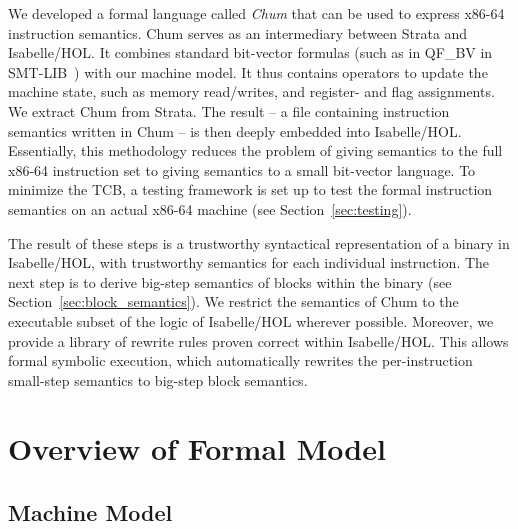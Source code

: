 We developed a formal language called \emph{Chum} that can be used to express x86-64 instruction semantics.
Chum serves as an intermediary between Strata and Isabelle/HOL.
It combines standard bit-vector formulas (such as in QF\_BV in SMT-LIB~\cite{barrett2010smt}) with our machine model.
It thus contains operators to update the machine state, such as memory read/writes, and register- and flag assignments.
We extract Chum from Strata.
The result -- a file containing instruction semantics written in Chum -- is then deeply embedded into Isabelle/HOL.
Essentially, this methodology reduces the problem of giving semantics to the full x86-64 instruction set to giving semantics to a small bit-vector language.
To minimize the TCB, a testing framework is set up to test the formal instruction semantics on an actual x86-64 machine (see Section~\ref{sec:testing}).

The result of these steps is a trustworthy syntactical representation of a binary in Isabelle/HOL, with trustworthy semantics for each individual instruction.
The next step is to derive big-step semantics of blocks within the binary (see Section~\ref{sec:block_semantics}).
We restrict the semantics of Chum to the executable subset of the logic of Isabelle/HOL wherever possible.
Moreover, we provide a library of rewrite rules proven correct within Isabelle/HOL.
This allows formal symbolic execution, which automatically rewrites the per-instruction small-step semantics to big-step block semantics.




\section{Overview of Formal Model}\label{sec:overview}

\subsection{Machine Model}\label{sec:machine_model_overview}

